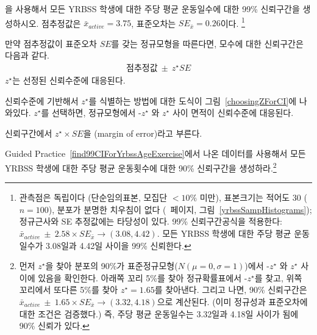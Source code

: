 \begin{exercise} \label{find99CIForYrbssAgeExercise}
을 사용해서 모든 YRBSS 학생에 대한 주당 평균 운동일수에 대한 99\% 신뢰구간을 생성하시오. 점추정값은 $\bar{x}_{active} = 3.75$, 표준오차는 $SE_{\bar{x}} = 0.26$이다. 
\footnote{
관측점은 독립이다 (단순임의표본, 모집단 $<10\%$ 미만), 표본크기는 적어도 30 ($n = 100$), 분포가 분명한 치우침이 없다 (\pageref{yrbssSampHistograms}~페이지, 그림~\ref{yrbssSampHistograms}); 정규근사와 SE 추정값에는 타당성이 있다. 99\% 신뢰구간공식을 적용한다: $\bar{x}_{active}\ \pm\ 2.58 \times  SE_{\bar{x}} \rightarrow (3.08, 4.42)$. 모든 YRBSS 학생에 대한 주당 평균 운동일수가 3.08일과 4.42일 사이을 99\% 신뢰한다.}
\end{exercise}

\begin{termBox}{
만약 점추정값이 표준오차 $SE$를 갖는 정규모형을 따른다면, 모수에 대한 신뢰구간은 다음과 같다.
\begin{eqnarray*}
\text{점추정값}\ \pm\ z^{\star} SE
\end{eqnarray*}
$z^{\star}$는 선정된 신뢰수준에 대응된다.}
\end{termBox}

신뢰수준에 기반해서 $z^{\star}$를 식별하는 방법에 대한 도식이 그림~\ref{choosingZForCI}에 나와있다. $z^{\star}$를 선택하면, 정규모형에서 -$z^{\star}$ 와 $z^{\star}$ 사이 면적이 신뢰수준에 대응된다.

\begin{termBox}{
\label{marginOfErrorTermBox}신뢰구간에서 $z^{\star}\times SE$을 (margin of error)라고 부른다.}
\end{termBox}

\textC{\newpage}

\begin{exercise} \label{find90CIForYrbssAgeExercise}
Guided Practice~\ref{find99CIForYrbssAgeExercise}에서 나온 데이터를 사용해서 모든 YRBSS 학생에 대한 주당 평균 운동횟수에 대한 90\% 신뢰구간을 생성하라.\footnote{
먼저 $z^{\star}$을 찾아 분포의 90\%가 표준정규모형($N(\mu=0, \sigma=1)$)에서 -$z^{\star}$ 와 $z^{\star}$ 사이에 있음을 확인한다. 아래쪽 꼬리 5\%를 찾아 정규확률표에서 -$z^{\star}$를 찾고, 위쪽 꼬리에서 또다른 5\%를 찾아 $z^{\star}=1.65$를 찾아낸다. 그리고 나면, 90\% 신뢰구간은 $\bar{x}_{active}\ \pm\ 1.65\times SE_{\bar{x}} \to (3.32, 4.18)$으로 계산된다. (이미 정규성과 표준오차에 대한 조건은 검증했다.) 즉, 주당 평균 운동일수는 3.32일과 4.18일 사이가 됨에 90\% 신뢰가 있다.}
\end{exercise}

